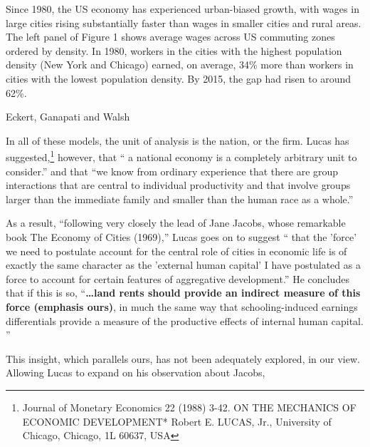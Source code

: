 \epigraph{Since 1980, the US economy has experienced urban-biased growth, with wages in large cities rising substantially faster than wages in smaller cities and rural areas. The left panel of Figure 1 shows average wages across US commuting zones ordered by density. In 1980, workers in the cities with the highest population density (New York and Chicago) earned, on average, 34\% more than workers in cities with the lowest population density. By 2015, the gap had risen to around 62\%.}{Eckert, Ganapati and Walsh \cite{eckertUrbanBiasedGrowthMacroeconomic2022}}


In all of these models, the unit of analysis is the nation,  or the firm. Lucas has suggested,\footnote{Journal of Monetary Economics 22 (1988) 3-42.  ON THE MECHANICS OF ECONOMIC DEVELOPMENT*
Robert E. LUCAS, Jr., University of Chicago, Chicago, 1L 60637, USA}
however, that `` a national economy is a completely arbitrary unit to consider.'' and that ``we know from ordinary experience that there are group interactions that are central to individual productivity and that involve groups larger than the immediate family and smaller than the human race as a whole.''  

As a result, ``following very closely the lead of Jane Jacobs, whose remarkable book The Economy of Cities (1969),'' Lucas goes on to suggest `` that the 'force' we need to postulate account for the central role of cities in economic life is of exactly the same character as the 'external human capital' I have postulated as a force to account for certain features of aggregative development.''  He concludes that if this is so, ``\textbf{\dots land rents should provide an indirect measure of this force (emphasis  ours)}, in much the same way that schooling-induced earnings differentials provide a measure of the productive effects of internal human capital. ''

This insight, which parallels ours, has not been adequately explored, in our view.  Allowing Lucas to expand on his observation about Jacobs, 



